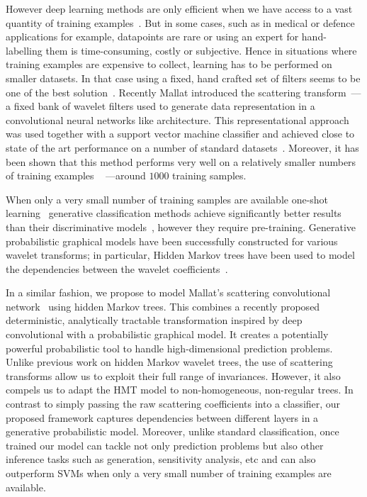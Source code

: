 \documentclass{article}
\begin{document}
  However deep learning methods are only efficient when we have access to a vast quantity of training examples~\cite{glorot2010understanding}. But in some cases, such as in medical or defence applications for example, datapoints are rare or using an expert for hand-labelling them is time-consuming, costly or subjective. Hence in situations where training examples are expensive to collect, learning has to be performed on smaller
  datasets. In that case using a fixed, hand crafted set of filters seems to be one of the best solution~\cite{hsiang2001embedded}. Recently Mallat introduced the scattering transform~\cite{mallat2012gis}--- a fixed bank of wavelet filters used to generate data representation in a convolutional neural networks like architecture. This representational approach was used together with a support vector machine classifier and achieved close to state of the art performance on a number of standard datasets~\cite{bruna2010classification}. Moreover, it has been shown that this method performs very well on a relatively smaller numbers of training examples ~\cite{sifre2013rotation} ---\ie around $1000$ training samples.

  When only a very small number of training samples are available one-shot learning~\cite{fei2006one} generative classification methods achieve significantly better results than their discriminative models~\cite{jordan2002discriminative}, however they require pre-training. Generative probabilistic graphical models have been successfully constructed for various wavelet transforms; in particular, Hidden Markov trees have been used to model the dependencies between the wavelet coefficients~\cite{crouse1998wavelet, kingsbury2001complex, durand2004computational}.
  
  In a similar fashion, we propose to model Mallat's scattering convolutional network~\cite{bruna2010classification} using hidden Markov trees. This combines a recently proposed deterministic, analytically tractable transformation inspired by deep convolutional with a probabilistic graphical model. It creates a potentially powerful probabilistic tool to handle high-dimensional prediction problems. Unlike previous work on hidden Markov wavelet trees, the use of scattering transforms allow us to exploit their full range of invariances. However, it also compels us to adapt the HMT model to non-homogeneous, non-regular trees. In contrast to simply passing the raw scattering coefficients into a classifier, our proposed framework captures dependencies between different layers in a generative probabilistic model. Moreover, unlike standard classification, once
  trained our model can tackle not only prediction problems but also other inference tasks such as generation, sensitivity analysis, etc and can also outperform SVMs when only a very small number of training examples are available.
\end{document}
